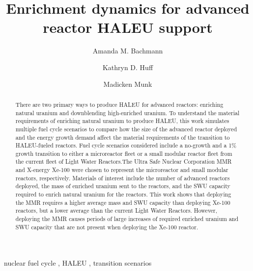 \documentclass[preprint]{elsarticle}
\providecommand{\DIFaddbegin}{} %
\providecommand{\DIFaddend}{} %
\begin{document}
\begin{frontmatter}
\title{Enrichment dynamics for advanced reactor HALEU support}
\author[uiuc]{Amanda M. Bachmann}
\author[uiuc]{Kathryn D. Huff}
\author[uiuc,ncsa]{Madicken Munk}
\address[uiuc]{Dept. of Nuclear, Plasma, and Radiological Engineering, University of Illinois at Urbana-Champaign, Urbana, IL 61801}
\address[ncsa]{National Center for Supercomputing Applications, University of Illinois at Urbana-Champaign, Urbana, IL, 61801}
\begin{keyword}
nuclear fuel cycle \sep
HALEU \sep
transition scenarios
\end{keyword}
\begin{abstract}
There are two primary ways to produce \gls{HALEU} 
for advanced
reactors: enriching natural uranium and downblending high-enriched uranium. 
To understand the material requirements of enriching natural uranium to 
produce \gls{HALEU}, this 
work simulates multiple fuel cycle scenarios to compare how the size of the
advanced reactor deployed and the energy growth demand affect the 
material requirements of the transition to \gls{HALEU}-fueled reactors. Fuel 
cycle scenarios considered include a no-growth and a 1\% growth transition to 
either a microreactor fleet or a small modular reactor fleet from the 
current fleet of Light Water Reactors.The Ultra Safe Nuclear Corporation 
\gls{MMR} and X-energy Xe-100 were chosen to represent the microreactor 
and small modular reactors, respectively. Materials of interest include 
the number of 
advanced reactors deployed, the mass of enriched uranium sent to the reactors, 
and the \gls{SWU} capacity required to enrich natural uranium for the reactors.
This work shows that deploying the \gls{MMR} requires a higher 
average mass and \gls{SWU} capacity than deploying Xe-100 reactors, but 
a lower average than the current Light Water Reactors. 
However, 
deploying the \gls{MMR} causes periods of large increases of required 
enriched uranium and \gls{SWU} capacity that are not present when 
deploying the Xe-100 reactor.
\DIFaddbegin 

\DIFaddend \end{abstract}

\end{frontmatter}
\glsresetall
\end{document}
